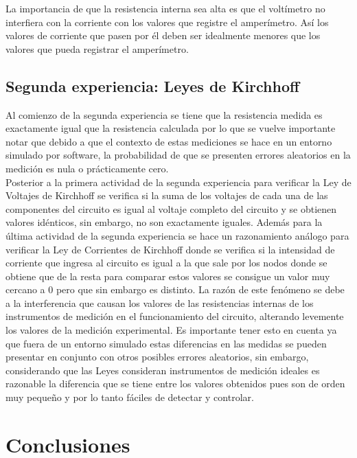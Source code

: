 \documentclass[letterpaper,11pt]{article} %
\begin{document}
La importancia de que la resistencia interna sea alta es que el voltímetro no interfiera con la corriente con los valores que registre el amperímetro. Así los valores de corriente que pasen por él deben ser idealmente menores que los valores que pueda registrar el amperímetro.




\subsection{Segunda experiencia: Leyes de Kirchhoff}

Al comienzo de la segunda experiencia se tiene que la resistencia medida es exactamente igual que la resistencia calculada por lo que se vuelve importante notar que debido a que el contexto de estas mediciones se hace en un entorno simulado por software, la probabilidad de que se presenten errores aleatorios en la medición es nula o prácticamente cero. \\ 

Posterior a la primera actividad de la segunda experiencia para verificar la Ley de Voltajes de Kirchhoff se verifica si la suma de los voltajes de cada una de las componentes del circuito es igual al voltaje completo del circuito y se obtienen valores idénticos, sin embargo, no son exactamente iguales. Además para la última actividad de la segunda experiencia se hace un razonamiento análogo para verificar la Ley de Corrientes de Kirchhoff donde se verifica si la intensidad de corriente que ingresa al circuito es igual a la que sale por los nodos donde se obtiene que de la resta para comparar estos valores se consigue un valor muy cercano a $0$ pero que sin embargo es distinto. La razón de este fenómeno se debe a la interferencia que causan los valores de las resistencias internas de los instrumentos de medición en el funcionamiento del circuito, alterando levemente los valores de la medición experimental. Es importante tener esto en cuenta ya que fuera de un entorno simulado estas diferencias en las medidas se pueden presentar en conjunto con otros posibles errores aleatorios, sin embargo, considerando que las Leyes consideran instrumentos de medición ideales es razonable la diferencia que se tiene entre los valores obtenidos pues son de orden muy pequeño y por lo tanto fáciles de detectar y controlar.

\newpage
\section{Conclusiones}
\end{document}

